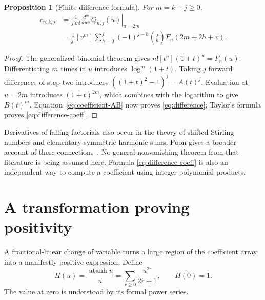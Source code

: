 \documentclass[11pt]{article}
\numberwithin{equation}{section}
\newtheorem{proposition}[theorem]{Proposition}
\theoremstyle{definition}
\theoremstyle{remark}
\DeclareMathOperator{\atanh}{atanh}
\begin{document}
\begin{proposition}[Finite-difference formula]\label{prop:difference}
For $m=k-j\ge0$,
\begin{align}
 c_{n,k,j}
 &=\frac{1}{j!m!}
       \left.\frac{d^m}{du^m}Q_{n,j}(u)\right|_{u=2m}
       \label{eq:difference}\\
 &=\frac1{j!}[v^m]\sum_{h=0}^j(-1)^{j-h}\binom jh
       F_n(2m+2h+v).\label{eq:difference-coeff}
\end{align}
\end{proposition}
\begin{proof}
The generalized binomial theorem gives
$n![t^n](1+t)^u=F_n(u)$. Differentiating $m$ times in $u$ introduces
$\log^m(1+t)$. Taking $j$ forward differences of step two introduces
$((1+t)^2-1)^j=A(t)^j$. Evaluation at $u=2m$ introduces
$(1+t)^{2m}$, which combines with the logarithm to give $B(t)^m$.
Equation~\eqref{eq:coefficient-AB} now proves \eqref{eq:difference};
Taylor's formula proves \eqref{eq:difference-coeff}.
\end{proof}

Derivatives of falling factorials also occur in the theory of shifted
Stirling numbers and elementary symmetric harmonic sums; Poon gives a
broader account of these connections~\cite{poon}. No general nonvanishing
theorem from that literature is being assumed here. Formula
\eqref{eq:difference-coeff} is also an independent way to compute a
coefficient using integer polynomial products.

\section{A transformation proving positivity}\label{sec:positivity}
A fractional-linear change of variable turns a large region of the
coefficient array into a manifestly positive expression. Define
\begin{equation}\label{eq:H}
 H(u)=\frac{\atanh u}{u}=\sum_{r\ge0}\frac{u^{2r}}{2r+1},
 \qquad H(0)=1.
\end{equation}
The value at zero is understood by its formal power series.
\end{document}
